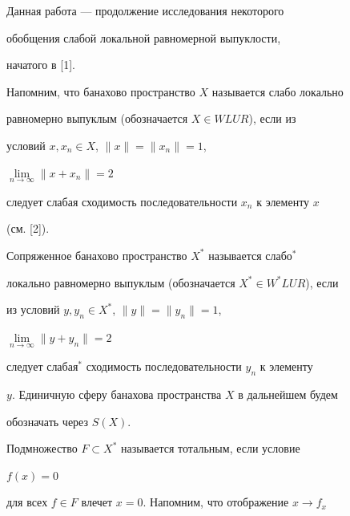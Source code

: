 \pagestyle{plain} %


  


  




  


\maketitle  


 


Данная работа --- продолжение исследования некоторого 


обобщения слабой локальной равномерной выпуклости, 


начатого в [1]. 


 


Напомним, что банахово пространство $X$ называется слабо локально 


равномерно выпуклым (обозначается $X\in WLUR$), если из 


условий $x,x_n\in X$, $\|x\|=\|x_n\|=1$, 


$\lim\limits_{n\to\infty}\|x+x_n\|=2$ 


следует слабая сходимость последовательности $x_n$ к элементу $x$ 


(см. [2]). 


 


Сопряженное банахово пространство $X^*$ называется слабо${}^*$ 


локально равномерно выпуклым (обозначается $X^*\in W^*LUR$), если 


из условий $y,y_n\in X^*$, $\|y\|=\|y_n\|=1$, 


$\lim\limits_{n\to\infty}\|y+y_n\|=2$ 


следует слабая${}^*$ сходимость последовательности $y_n$ к элементу 


$y$. Единичную сферу банахова пространства $X$ в дальнейшем будем 


обозначать через $S(X)$. 


 


Подмножество $F\subset X^*$ называется тотальным, если условие 


$f(x)=0$ 


для всех $f\in F$ влечет $x=0$. Напомним, что отображение $x\to f_x$ 


